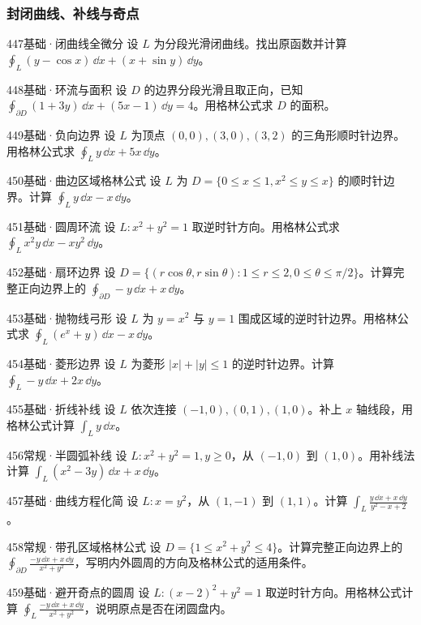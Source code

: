 \subsubsection{封闭曲线、补线与奇点}
\begin{exercise}{447}{基础·闭曲线全微分}
设 $L$ 为分段光滑闭曲线。找出原函数并计算 $\oint_L(y-\cos x)\,\dd x+(x+\sin y)\,\dd y$。
\end{exercise}
\begin{exercise}{448}{基础·环流与面积}
设 $D$ 的边界分段光滑且取正向，已知 $\oint_{\partial D}(1+3y)\,\dd x+(5x-1)\,\dd y=4$。用格林公式求 $D$ 的面积。
\end{exercise}
\begin{exercise}{449}{基础·负向边界}
设 $L$ 为顶点 $(0,0),(3,0),(3,2)$ 的三角形顺时针边界。用格林公式求 $\oint_Ly\,\dd x+5x\,\dd y$。
\end{exercise}
\begin{exercise}{450}{基础·曲边区域格林公式}
设 $L$ 为 $D=\{0\leq x\leq1,x^2\leq y\leq x\}$ 的顺时针边界。计算 $\oint_Ly\,\dd x-x\,\dd y$。
\end{exercise}
\begin{exercise}{451}{基础·圆周环流}
设 $L:x^2+y^2=1$ 取逆时针方向。用格林公式求 $\oint_Lx^2y\,\dd x-xy^2\,\dd y$。
\end{exercise}
\begin{exercise}{452}{基础·扇环边界}
设 $D=\{(r\cos\theta,r\sin\theta):1\leq r\leq2,0\leq\theta\leq\pi/2\}$。计算完整正向边界上的 $\oint_{\partial D}-y\,\dd x+x\,\dd y$。
\end{exercise}
\begin{exercise}{453}{基础·抛物线弓形}
设 $L$ 为 $y=x^2$ 与 $y=1$ 围成区域的逆时针边界。用格林公式求 $\oint_L(e^x+y)\,\dd x-x\,\dd y$。
\end{exercise}
\begin{exercise}{454}{基础·菱形边界}
设 $L$ 为菱形 $|x|+|y|\leq1$ 的逆时针边界。计算 $\oint_L-y\,\dd x+2x\,\dd y$。
\end{exercise}
\begin{exercise}{455}{基础·折线补线}
设 $L$ 依次连接 $(-1,0),(0,1),(1,0)$。补上 $x$ 轴线段，用格林公式计算 $\int_Ly\,\dd x$。
\end{exercise}
\begin{exercise}{456}{常规·半圆弧补线}
设 $L:x^2+y^2=1,y\geq0$，从 $(-1,0)$ 到 $(1,0)$。用补线法计算 $\int_L(x^2-3y)\,\dd x+x\,\dd y$。
\end{exercise}
\begin{exercise}{457}{基础·曲线方程化简}
设 $L:x=y^2$，从 $(1,-1)$ 到 $(1,1)$。计算 $\int_L\frac{y\,\dd x+x\,\dd y}{y^2-x+2}$。
\end{exercise}
\begin{exercise}{458}{常规·带孔区域格林公式}
设 $D=\{1\leq x^2+y^2\leq4\}$。计算完整正向边界上的 $\oint_{\partial D}\frac{-y\,\dd x+x\,\dd y}{x^2+y^2}$，写明内外圆周的方向及格林公式的适用条件。
\end{exercise}
\begin{exercise}{459}{基础·避开奇点的圆周}
设 $L:(x-2)^2+y^2=1$ 取逆时针方向。用格林公式计算 $\oint_L\frac{-y\,\dd x+x\,\dd y}{x^2+y^2}$，说明原点是否在闭圆盘内。
\end{exercise}
